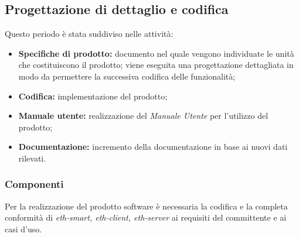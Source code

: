 \subsection{Progettazione di dettaglio e codifica}

\noindent Questo periodo è stata suddiviso nelle attività:
\begin{itemize}
	\item \textbf{Specifiche di prodotto:} documento nel quale vengono individuate le unità che costituiscono il prodotto; viene eseguita una progettazione dettagliata in modo da permettere la successiva codifica delle funzionalità;
	\item  \textbf{Codifica:} implementazione del prodotto;
	\item \textbf{Manuale utente:} realizzazione del \textit{Manuale Utente} per l'utilizzo del prodotto;
	\item \textbf{Documentazione:} incremento della documentazione in base ai nuovi dati rilevati.
\end{itemize}
\subsubsection{Componenti}
Per la realizzazione del prodotto software è necessaria la codifica e la completa conformità di \textit{eth-smart, eth-client, eth-server} ai requisiti del committente e ai casi d'uso.
